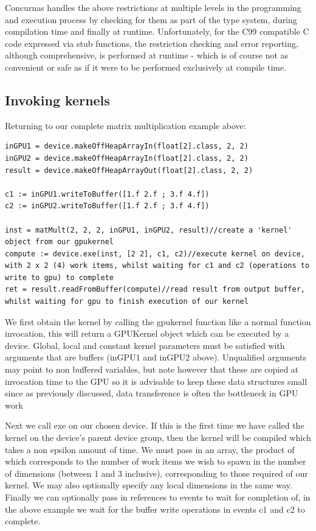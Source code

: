 \documentclass[conc-doc]{subfiles}
\begin{document}
Concurnas handles the above restrictions at multiple levels in the programming and execution process by checking for them as part of the type system, during compilation time and finally at runtime. Unfortunately, for the C99 compatible C code expressed via stub functions, the restriction checking and error reporting, although comprehensive, is performed at runtime - which is of course not as convenient or safe as if it were to be performed exclusively at compile time.

\subsection{Invoking kernels}
Returning to our complete matrix multiplication example above:
\begin{lstlisting}
inGPU1 = device.makeOffHeapArrayIn(float[2].class, 2, 2)
inGPU2 = device.makeOffHeapArrayIn(float[2].class, 2, 2)
result = device.makeOffHeapArrayOut(float[2].class, 2, 2)

c1 := inGPU1.writeToBuffer([1.f 2.f ; 3.f 4.f])
c2 := inGPU2.writeToBuffer([1.f 2.f ; 3.f 4.f])

inst = matMult(2, 2, 2, inGPU1, inGPU2, result)//create a 'kernel' object from our gpukernel
compute := device.exe(inst, [2 2], c1, c2)//execute kernel on device, with 2 x 2 (4) work items, whilst waiting for c1 and c2 (operations to write to gpu) to complete
ret = result.readFromBuffer(compute)//read result from output buffer, whilst waiting for gpu to finish execution of our kernel
\end{lstlisting}

We first obtain the kernel by calling the gpukernel function like a normal function invocation, this will return a GPUKernel object which can be executed by a device. Global, local and constant kernel parameters must be satisfied with arguments that are buffers (inGPU1 and inGPU2 above). Unqualified arguments may point to non buffered variables, but note however that these are copied at invocation time to the GPU so it is advisable to keep these data structures small since as previously discussed, data transference is often the bottleneck in GPU work

Next we call exe on our chosen device. If this is the first time we have called the kernel on the device's parent device group, then the kernel will be compiled which takes a non epsilon amount of time. We must pass in an array, the product of which corresponds to the number of work items we wish to spawn in the number of dimensions (between 1 and 3 inclusive), corresponding to those required of our kernel. We may also optionally specify any local dimensions in the same way. Finally we can optionally pass in references to events to wait for completion of, in the above example we wait for the buffer write operations in events c1 and c2 to complete.
\end{document}
